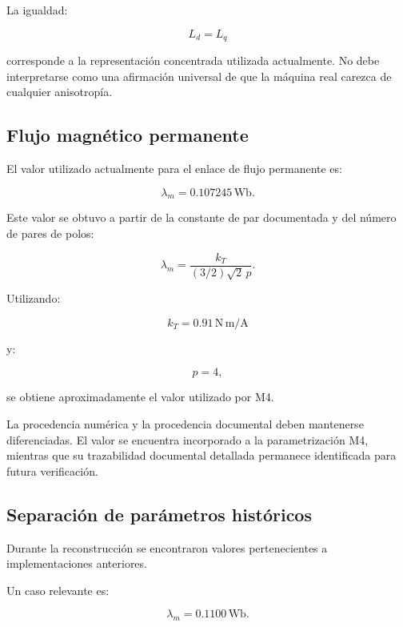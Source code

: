 La igualdad:

\begin{equation}
L_d=L_q
\end{equation}

corresponde a la representación concentrada utilizada actualmente. No debe interpretarse como una afirmación universal de que la máquina real carezca de cualquier anisotropía.

\subsection{Flujo magnético permanente}

El valor utilizado actualmente para el enlace de flujo permanente es:

\begin{equation}
\lambda_m=0.107245\,\mathrm{Wb}.
\end{equation}

Este valor se obtuvo a partir de la constante de par documentada y del número de pares de polos:

\begin{equation}
\lambda_m=
\frac{k_T}
{(3/2)\sqrt{2}\,p}.
\end{equation}

Utilizando:

\begin{equation}
k_T=0.91\,\mathrm{N\,m/A}
\end{equation}

y:

\begin{equation}
p=4,
\end{equation}

se obtiene aproximadamente el valor utilizado por M4.

La procedencia numérica y la procedencia documental deben mantenerse diferenciadas. El valor se encuentra incorporado a la parametrización M4, mientras que su trazabilidad documental detallada permanece identificada para futura verificación.

\subsection{Separación de parámetros históricos}

Durante la reconstrucción se encontraron valores pertenecientes a implementaciones anteriores.

Un caso relevante es:

\begin{equation}
\lambda_m=0.1100\,\mathrm{Wb}.
\end{equation}

